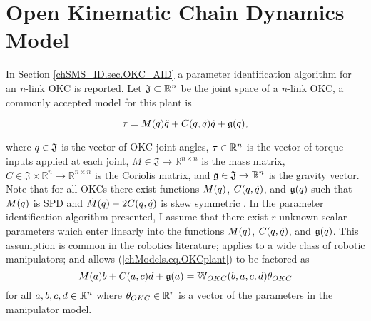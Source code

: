 \section{Open Kinematic Chain Dynamics Model}
\label{chModels.sec.OKC}


In Section \ref{chSMS_ID.sec.OKC_AID} a parameter identification
algorithm for an {\it n}-link \ac{OKC} is reported.  Let
$\mathfrak{J}\subset\mathbb{R}^{n}$ be the joint space of a {\it n}-link
\ac{OKC}, a commonly accepted model for this plant is

\begin{equation} \label{chModels.eq.OKCplant}
  \tau =M(q)\ddot{q}+C(q,\dot{q})\dot{q}+\mathfrak{g}(q), 
\end{equation}

\noindent where $q\in\mathfrak{J}$ is the vector of \ac{OKC}
joint angles, $\tau\in\mathbb{R}^{n}$ is the vector of torque
inputs applied at each joint, $M\in\mathfrak{J}\to\mathbb{R}^{n \times
  n}$ is the mass matrix,
$C\in\mathfrak{J}\times\mathbb{R}^n\to\mathbb{R}^{n \times n}$ is the
Coriolis matrix, and $\mathfrak{g}\in\mathfrak{J}\to\mathbb{R}^{n}$ is the
gravity vector. Note that for all \acp{OKC} there exist functions
$M(q)$, $C(q,\dot{q})$, and $\mathfrak{g}(q)$ such
that $M(q)$ is \ac{SPD} and
$\dot{M}(q)-2C(q,\dot{q})$ is skew symmetric
\cite{takegaki1981new}. %
%
In the parameter identification algorithm presented, I assume that
there exist $r$ unknown scalar parameters which enter linearly into
the functions $M(q)$, $C(q,\dot{q})$, and
$\mathfrak{g}(q)$.  
%
This assumption is common in the robotics literature; applies to a
wide class of robotic manipulators; and 
allows (\ref{chModels.eq.OKCplant}) to be factored as
%
\begin{equation} \label{chModels.eq.OKCplantW}
  M(a)b+C(a,c)d+\mathfrak{g}(a)=\mathbb{W}_{OKC}(b,a,c,d)\theta_{OKC} 
\end{equation}
%
for all $a,b,c,d\in\mathbb{R}^{n}$ where $\theta_{OKC}\in\mathbb{R}^r$ is a
vector of the parameters in the manipulator
model\cite{Craig&hsu&sastry.ijrr87}.

